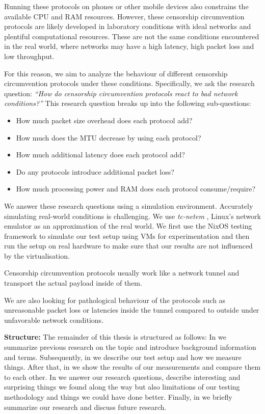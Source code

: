 Running these protocols on phones or other mobile devices also constrains the available CPU and RAM resources.
However, these censorship circumvention protocols are likely developed in laboratory conditions with ideal networks and plentiful computational resources.
These are not the same conditions encountered in the real world, where networks may have a high latency, high packet loss and low throughput.

For this reason, we aim to analyze the behaviour of different censorship circumvention protocols under these conditions.
Specifically, we ask the research question:
\emph{``How do censorship circumvention protocols react to bad network conditions?''}
This research question breaks up into the following sub-questions:
\begin{itemize}
  \item How much packet size overhead does each protocol add?
  \item How much does the MTU decrease by using each protocol?
  \item How much additional latency does each protocol add?
  \item Do any protocols introduce additional packet loss?
  \item How much processing power and RAM does each protocol consume/require?
\end{itemize}

We answer these research questions using a simulation environment.
Accurately simulating real-world conditions is challenging.
We use \textit{tc-netem} \cite{man8:tc-netem}, Linux's network emulator as an approximation of the real world.
We first use the NixOS testing framework to simulate our test setup using VMs for experimentation and then run the setup on real hardware to make sure that our results are not influenced by the virtualisation.

Censorship circumvention protocols usually work like a network tunnel and transport the actual payload inside of them.

We are also looking for pathological behaviour of the protocols such as unreasonable packet loss or latencies inside the tunnel compared to outside under unfavorable network conditions.

\noindent\textbf{Structure:}
The remainder of this thesis is structured as follows:
In  we summarize previous research on the topic and introduce background information and terms.
Subsequently, in  we describe our test setup and how we measure things.
After that, in  we show the results of our measurements and compare them to each other.
In  we answer our research questions, describe interesting and surprising things we found along the way but also limitations of our testing methodology and things we could have done better.
Finally, in  we briefly summarize our research and discuss future research.
